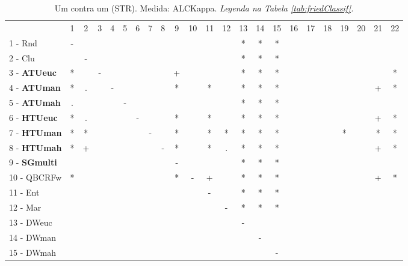 \begin{table}[h]
\caption{Um contra um (STR). Medida: ALCKappa. \textit{Legenda na Tabela \ref{tab:friedClassif}.}}
\begin{center}\begin{tabular}{lcc|cc|cc|cc|cc|cc|cc|cc|cc|cc|cc}
 			& 1 & 2 & 3 & 4 & 5 & 6 & 7 & 8 & 9 & 10 & 11 & 12 & 13 & 14 & 15 & 16 & 17 & 18 & 19 & 20 & 21 & 22\\
1 - Rnd  	& - &   &   &   &   &   &   &   &   &   &   &   & * & * & * &   &   &   &   &   &   &   \\
2 - Clu  	&   & - &   &   &   &   &   &   &   &   &   &   & * & * & * &   &   &   &   &   &   &   \\ \hline
3 - \textbf{ATUeuc}	& * &   & - &   &   &   &   &   & + &   &   &   & * & * & * &   &   &   &   &   &   & * \\
4 - \textbf{ATUman}	& * & . &   & - &   &   &   &   & * &   & * &   & * & * & * &   &   &   &   &   & + & * \\ \hline
5 - \textbf{ATUmah}	& . &   &   &   & - &   &   &   &   &   &   &   & * & * & * &   &   &   &   &   &   &   \\
6 - \textbf{HTUeuc}	& * & . &   &   &   & - &   &   & * &   & * &   & * & * & * &   &   &   &   &   & + & * \\ \hline
7 - \textbf{HTUman}	& * & * &   &   &   &   & - &   & * &   & * & * & * & * & * &   &   &   & * &   & * & * \\
8 - \textbf{HTUmah}	& * & + &   &   &   &   &   & - & * &   & * & . & * & * & * &   &   &   &   &   & + & * \\ \hline
9 - \textbf{SGmulti}	&   &   &   &   &   &   &   &   & - &   &   &   & * & * & * &   &   &   &   &   &   &   \\
10 - QBCRFw	& * &   &   &   &   &   &   &   & * & - & + &   & * & * & * &   &   &   &   &   & + & * \\ \hline
11 - Ent  	&   &   &   &   &   &   &   &   &   &   & - &   & * & * & * &   &   &   &   &   &   &   \\
12 - Mar  	&   &   &   &   &   &   &   &   &   &   &   & - & * & * & * &   &   &   &   &   &   &   \\ \hline
13 - DWeuc	&   &   &   &   &   &   &   &   &   &   &   &   & - &   &   &   &   &   &   &   &   &   \\
14 - DWman	&   &   &   &   &   &   &   &   &   &   &   &   &   & - &   &   &   &   &   &   &   &   \\ \hline
15 - DWmah	&   &   &   &   &   &   &   &   &   &   &   &   &   &   & - &   &   &   &   &   &   &   \\

\end{tabular}
\end{center}
\end{table}
